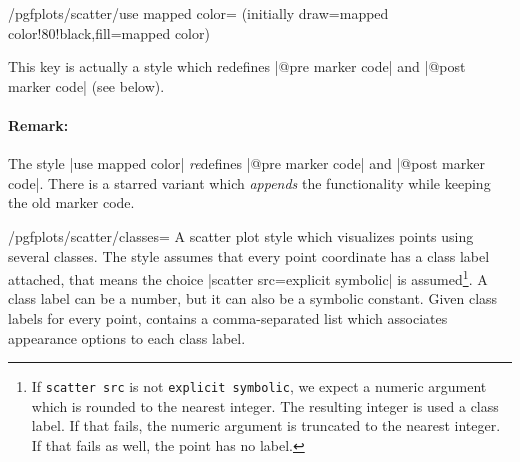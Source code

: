 {\begin{stylekey}{/pgfplots/scatter/use mapped color= (initially draw=mapped color!80!black,fill=mapped color)}
%
\begin{codeexample}[]
\end{codeexample}
	This key is actually a style which redefines |@pre marker code| and |@post marker code| (see below).

	\paragraph{Remark:} The style |use mapped color| \emph{re}defines |@pre marker code| and |@post marker code|. There is a starred variant  which \emph{appends} the functionality while keeping the old marker code.
\end{stylekey}

\begin{stylekey}{/pgfplots/scatter/classes=}
\label{pgfplots:scatterclasses}
	A scatter plot style which visualizes points using several classes. The style assumes that every point coordinate has a class label attached, that means the choice |scatter src=explicit symbolic| is assumed\footnote{If \texttt{scatter src} is not \texttt{explicit symbolic}, we expect a numeric argument which is rounded to the nearest integer. The resulting integer is used a class label. If that fails, the numeric argument is truncated to the nearest integer. If that fails as well, the point has no label.}. A class label can be a number, but it can also be a symbolic constant. Given class labels for every point,  contains a comma-separated list which associates appearance options to each class label.

\begin{codeexample}[]
\begin{tikzpicture}
\begin{axis}[scatter/classes={
	a={mark=square*,blue},%
	b={mark=triangle*,red},%
	c={mark=o,draw=black}}]


\end{axis}
\end{tikzpicture}
\end{codeexample}
\end{stylekey}}
